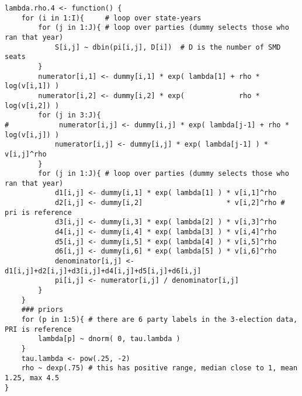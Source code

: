 \documentclass{article}
\begin{document}
\begin{lstlisting}
lambda.rho.4 <- function() {
    for (i in 1:I){     # loop over state-years
        for (j in 1:J){ # loop over parties (dummy selects those who ran that year) 
            S[i,j] ~ dbin(pi[i,j], D[i])  # D is the number of SMD seats
        }
        numerator[i,1] <- dummy[i,1] * exp( lambda[1] + rho * log(v[i,1]) )
        numerator[i,2] <- dummy[i,2] * exp(             rho * log(v[i,2]) )
        for (j in 3:J){
#            numerator[i,j] <- dummy[i,j] * exp( lambda[j-1] + rho * log(v[i,j]) )
            numerator[i,j] <- dummy[i,j] * exp( lambda[j-1] ) * v[i,j]^rho
        }
        for (j in 1:J){ # loop over parties (dummy selects those who ran that year) 
            d1[i,j] <- dummy[i,1] * exp( lambda[1] ) * v[i,1]^rho 
            d2[i,j] <- dummy[i,2]                    * v[i,2]^rho # pri is reference
            d3[i,j] <- dummy[i,3] * exp( lambda[2] ) * v[i,3]^rho 
            d4[i,j] <- dummy[i,4] * exp( lambda[3] ) * v[i,4]^rho 
            d5[i,j] <- dummy[i,5] * exp( lambda[4] ) * v[i,5]^rho 
            d6[i,j] <- dummy[i,6] * exp( lambda[5] ) * v[i,6]^rho 
            denominator[i,j] <- d1[i,j]+d2[i,j]+d3[i,j]+d4[i,j]+d5[i,j]+d6[i,j]
            pi[i,j] <- numerator[i,j] / denominator[i,j]
        }
    }
    ### priors
    for (p in 1:5){ # there are 6 party labels in the 3-election data, PRI is reference
        lambda[p] ~ dnorm( 0, tau.lambda )
    }
    tau.lambda <- pow(.25, -2)
    rho ~ dexp(.75) # this has positive range, median close to 1, mean 1.25, max 4.5
}
\end{lstlisting}
\end{document}
